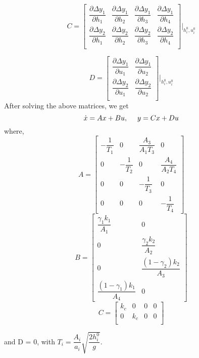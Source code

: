 \documentclass[10pt,a4paper, twocolumn]{article}
\begin{document}
\[
C =
\begin{bmatrix}
  \dfrac{\partial \Delta y_1}{\partial h_1} &
  \dfrac{\partial \Delta y_1}{\partial h_2} &
  \dfrac{\partial \Delta y_1}{\partial h_3} &
  \dfrac{\partial \Delta y_1}{\partial h_4} \\

  \dfrac{\partial \Delta y_2}{\partial h_1} &
  \dfrac{\partial \Delta y_2}{\partial h_2} &
  \dfrac{\partial \Delta y_2}{\partial h_3} &
  \dfrac{\partial \Delta y_2}{\partial h_4} \\
\end{bmatrix} \bigg |_{h_i^0, u_i^0}
\]

\[
D =
\begin{bmatrix}
  \dfrac{\partial \Delta y_1}{\partial u_1} &
  \dfrac{\partial \Delta y_1}{\partial u_2} \\

  \dfrac{\partial \Delta y_2}{\partial u_1} &
  \dfrac{\partial \Delta y_2}{\partial u_2} \\
\end{bmatrix} \bigg |_{h_i^0, u_i^0}
\]
After solving the above matrices, we get
\[
\dot{x} = Ax + Bu, \ \ \ \ \ 
\\
y = Cx + Du
\]
where,
\[
A =
\begin{bmatrix}
  -\dfrac{1}{T_1} & 0 & \dfrac{A_3}{A_1 T_3} & 0  \\
  0 & -\dfrac{1}{T_2} & 0 & \dfrac{A_4}{A_2 T_4}  \\
  0 & 0 & -\dfrac{1}{T_3} & 0 \\
  0 & 0 & 0 & -\dfrac{1}{T_4}
\end{bmatrix}
\]
\[
B =
\begin{bmatrix}
  \dfrac{\gamma_1 k_1}{A_1} & 0 \\
  0 & \dfrac{\gamma_2 k_2}{A_2} \\
  0 & \dfrac{(1-\gamma_2) k_2}{A_3} \\
  \dfrac{(1-\gamma_1) k_1}{A_4} & 0
\end{bmatrix}
\]
\[
C =
\begin{bmatrix}
k_c & 0 & 0 & 0 \\
0 & k_c & 0 & 0 \\
\end{bmatrix}
\]

and D = 0, with $T_i = \dfrac{A_i}{a_i}\sqrt{\dfrac{2h_i^0}{g}}$.
\end{document}

